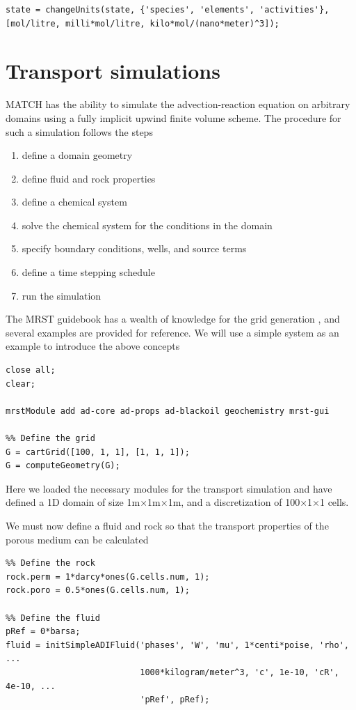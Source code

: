 \documentclass{article}
\begin{document}
\begin{lstlisting}
state = changeUnits(state, {'species', 'elements', 'activities'}, [mol/litre, milli*mol/litre, kilo*mol/(nano*meter)^3]);
\end{lstlisting}

\section{Transport simulations}

MATCH has the ability to simulate the advection-reaction equation on arbitrary domains using a fully implicit upwind finite volume scheme. The procedure for such a simulation follows the steps
\begin{enumerate}
    \item define a domain geometry
    \item define fluid and rock properties
    \item define a chemical system
    \item solve the chemical system for the conditions in the domain
    \item specify boundary conditions, wells, and source terms
    \item define a time stepping schedule
    \item run the simulation
\end{enumerate}

The MRST guidebook has a wealth of knowledge for the grid generation \cite{lie2014}, and several examples are provided for reference. We will use a simple system as an example to introduce the above concepts

\begin{lstlisting}
close all;
clear;

mrstModule add ad-core ad-props ad-blackoil geochemistry mrst-gui

%% Define the grid
G = cartGrid([100, 1, 1], [1, 1, 1]);
G = computeGeometry(G);
\end{lstlisting}

Here we loaded the necessary modules for the transport simulation and have defined a 1D domain of size 1m$\times$1m$\times$1m, and a discretization of 100$\times$1$\times$1 cells. 

We must now define a fluid and rock so that the transport properties of the porous medium can be calculated

\begin{lstlisting}
%% Define the rock
rock.perm = 1*darcy*ones(G.cells.num, 1);
rock.poro = 0.5*ones(G.cells.num, 1);

%% Define the fluid
pRef = 0*barsa;
fluid = initSimpleADIFluid('phases', 'W', 'mu', 1*centi*poise, 'rho', ...
                           1000*kilogram/meter^3, 'c', 1e-10, 'cR', 4e-10, ...
                           'pRef', pRef);
\end{lstlisting}
\end{document}
